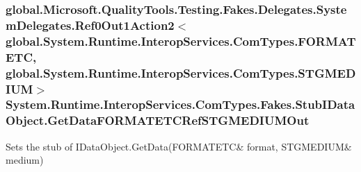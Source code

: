 \hypertarget{class_system_1_1_runtime_1_1_interop_services_1_1_com_types_1_1_fakes_1_1_stub_i_data_object_a4b76bc3aa6929b4885076f5b7ec7bd0d}{
\subsubsection[{Get\-Data\-F\-O\-R\-M\-A\-T\-E\-T\-C\-Ref\-S\-T\-G\-M\-E\-D\-I\-U\-M\-Out}]{\setlength{\rightskip}{0pt plus 5cm}global.\-Microsoft.\-Quality\-Tools.\-Testing.\-Fakes.\-Delegates.\-System\-Delegates.\-Ref0\-Out1\-Action2$<$global.\-System.\-Runtime.\-Interop\-Services.\-Com\-Types.\-F\-O\-R\-M\-A\-T\-E\-T\-C, global.\-System.\-Runtime.\-Interop\-Services.\-Com\-Types.\-S\-T\-G\-M\-E\-D\-I\-U\-M$>$ System.\-Runtime.\-Interop\-Services.\-Com\-Types.\-Fakes.\-Stub\-I\-Data\-Object.\-Get\-Data\-F\-O\-R\-M\-A\-T\-E\-T\-C\-Ref\-S\-T\-G\-M\-E\-D\-I\-U\-M\-Out}}\label{class_system_1_1_runtime_1_1_interop_services_1_1_com_types_1_1_fakes_1_1_stub_i_data_object_a4b76bc3aa6929b4885076f5b7ec7bd0d}


Sets the stub of I\-Data\-Object.\-Get\-Data(F\-O\-R\-M\-A\-T\-E\-T\-C\& format, S\-T\-G\-M\-E\-D\-I\-U\-M\& medium)

